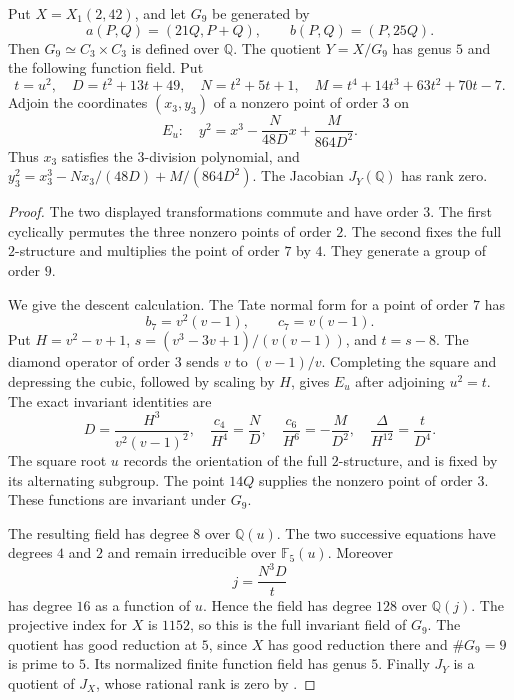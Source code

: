 \begin{lemma}\label{lem:nonic242-quotient5}
Put $X=X_1(2,42)$, and let $G_9$ be generated by
\[
 a(P,Q)=(21Q,P+Q),\qquad b(P,Q)=(P,25Q).
\]
Then $G_9\simeq C_3\times C_3$ is defined over $\mathbb Q$.
The quotient $Y=X/G_9$ has genus $5$ and the following function
field. Put
\[
 t=u^2,\quad D=t^2+13t+49,\quad N=t^2+5t+1,\quad
 M=t^4+14t^3+63t^2+70t-7.
\]
Adjoin the coordinates $(x_3,y_3)$ of a nonzero point of order $3$
on
\[
 E_u:\quad y^2=x^3-\frac{N}{48D}x+\frac{M}{864D^2}.
\]
Thus $x_3$ satisfies the $3$-division polynomial, and
$y_3^2=x_3^3-Nx_3/(48D)+M/(864D^2)$.
The Jacobian $J_Y(\mathbb Q)$ has rank zero.
\end{lemma}
\begin{proof}
The two displayed transformations commute and have order $3$.
The first cyclically permutes the three nonzero points of order $2$.
The second fixes the full $2$-structure and multiplies the point
of order $7$ by $4$. They generate a group of order $9$.

We give the descent calculation. The Tate normal form for a point
of order $7$ has
\[
 b_7=v^2(v-1),\qquad c_7=v(v-1).
\]
Put $H=v^2-v+1$, $s=(v^3-3v+1)/(v(v-1))$, and $t=s-8$.
The diamond operator of order $3$ sends $v$ to $(v-1)/v$.
Completing the square and depressing the cubic, followed by
scaling by $H$, gives $E_u$ after adjoining $u^2=t$.
The exact invariant identities are
\[
 D=\frac{H^3}{v^2(v-1)^2},\quad
 \frac{c_4}{H^4}=\frac ND,\quad
 \frac{c_6}{H^6}=-\frac M{D^2},\quad
 \frac{\Delta}{H^{12}}=\frac{t}{D^4}.
\]
The square root $u$ records the orientation of the full
$2$-structure, and is fixed by its alternating subgroup.
The point $14Q$ supplies the nonzero point of order $3$.
These functions are invariant under $G_9$.

The resulting field has degree $8$ over $\mathbb Q(u)$.
The two successive equations have degrees $4$ and $2$ and remain
irreducible over $\mathbb F_5(u)$.
Moreover
\[
 j=\frac{N^3D}{t}
\]
has degree $16$ as a function of $u$. Hence the field has degree
$128$ over $\mathbb Q(j)$. The projective index for $X$ is $1152$,
so this is the full invariant field of $G_9$.
The quotient has good reduction at $5$, since $X$ has good
reduction there and $\#G_9=9$ is prime to $5$.
Its normalized finite function field has genus $5$.
Finally $J_Y$ is a quotient of $J_X$, whose rational rank is zero
by \cite[Theorem~3.1]{DEHMZ}.
\end{proof}


